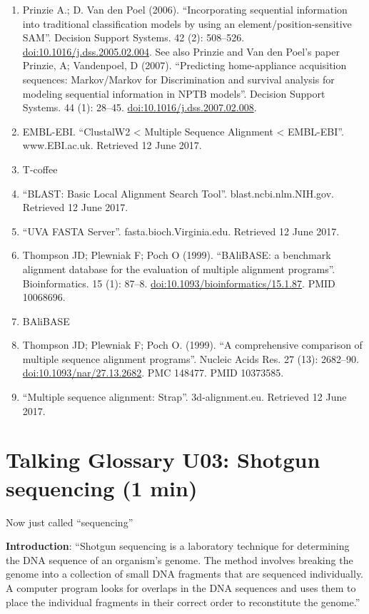 \documentclass[
]{book}
\begin{document}
\begin{enumerate}
\item
  Prinzie A.; D. Van den Poel (2006). ``Incorporating sequential information into traditional classification models by using an element/position-sensitive SAM''. Decision Support Systems. 42 (2): 508--526. \url{doi:10.1016/j.dss.2005.02.004}. See also Prinzie and Van den Poel's paper Prinzie, A; Vandenpoel, D (2007). ``Predicting home-appliance acquisition sequences: Markov/Markov for Discrimination and survival analysis for modeling sequential information in NPTB models''. Decision Support Systems. 44 (1): 28--45. \url{doi:10.1016/j.dss.2007.02.008}.
\item
  EMBL-EBI. ``ClustalW2 \textless{} Multiple Sequence Alignment \textless{} EMBL-EBI''. www.EBI.ac.uk. Retrieved 12 June 2017.
\item
  T-coffee
\item
  ``BLAST: Basic Local Alignment Search Tool''. blast.ncbi.nlm.NIH.gov. Retrieved 12 June 2017.
\item
  ``UVA FASTA Server''. fasta.bioch.Virginia.edu. Retrieved 12 June 2017.
\item
  Thompson JD; Plewniak F; Poch O (1999). ``BAliBASE: a benchmark alignment database for the evaluation of multiple alignment programs''. Bioinformatics. 15 (1): 87--8. \url{doi:10.1093/bioinformatics/15.1.87}. PMID 10068696.
\item
  BAliBASE
\item
  Thompson JD; Plewniak F; Poch O. (1999). ``A comprehensive comparison of multiple sequence alignment programs''. Nucleic Acids Res. 27 (13): 2682--90. \url{doi:10.1093/nar/27.13.2682}. PMC 148477. PMID 10373585.
\item
  ``Multiple sequence alignment: Strap''. 3d-alignment.eu. Retrieved 12 June 2017.
\end{enumerate}

\hypertarget{talking-glossary-u03-shotgun-sequencing-1-min}{%
\section{Talking Glossary U03: Shotgun sequencing (1 min)}\label{talking-glossary-u03-shotgun-sequencing-1-min}}

Now just called ``sequencing''

\textbf{Introduction}: ``Shotgun sequencing is a laboratory technique for determining the DNA sequence of an organism's genome. The method involves breaking the genome into a collection of small DNA fragments that are sequenced individually. A computer program looks for overlaps in the DNA sequences and uses them to place the individual fragments in their correct order to reconstitute the genome.''
\end{document}
